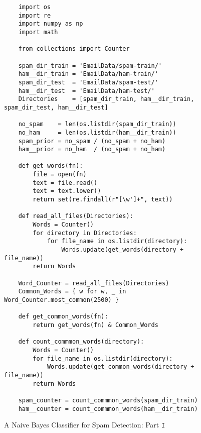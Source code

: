 \begin{figure}[!ht]
\centering

\begin{verbatim}
    import os
    import re
    import numpy as np
    import math

    from collections import Counter

    spam_dir_train = 'EmailData/spam-train/'
    ham__dir_train = 'EmailData/ham-train/'
    spam_dir_test  = 'EmailData/spam-test/'
    ham__dir_test  = 'EmailData/ham-test/'
    Directories    = [spam_dir_train, ham__dir_train, spam_dir_test, ham__dir_test]
    
    no_spam    = len(os.listdir(spam_dir_train))
    no_ham     = len(os.listdir(ham__dir_train))
    spam_prior = no_spam / (no_spam + no_ham)
    ham__prior = no_ham  / (no_spam + no_ham)

    def get_words(fn):
        file = open(fn)
        text = file.read()
        text = text.lower()
        return set(re.findall(r"[\w']+", text))

    def read_all_files(Directories):
        Words = Counter()
        for directory in Directories:
            for file_name in os.listdir(directory):
                Words.update(get_words(directory + file_name))
        return Words
    
    Word_Counter = read_all_files(Directories)
    Common_Words = { w for w, _ in Word_Counter.most_common(2500) }

    def get_common_words(fn):
        return get_words(fn) & Common_Words

    def count_commmon_words(directory):
        Words = Counter()
        for file_name in os.listdir(directory):
            Words.update(get_common_words(directory + file_name))
        return Words

    spam_counter = count_commmon_words(spam_dir_train)
    ham__counter = count_commmon_words(ham__dir_train)
\end{verbatim}

\caption{A Naive Bayes Classifier for Spam Detection: Part \texttt{I}}
\label{fig:Spam-Detection.ipynb-1}
\end{figure}

